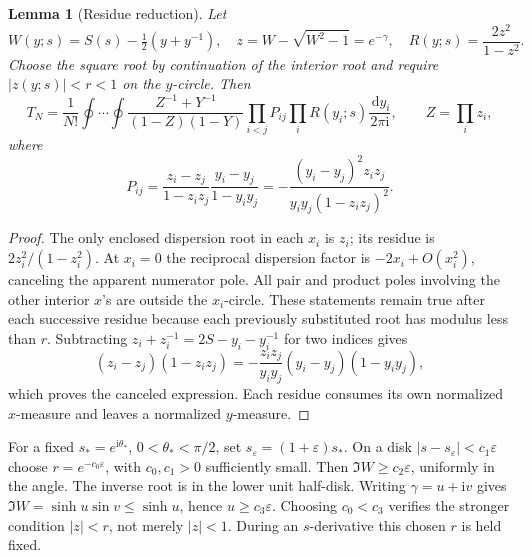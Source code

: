 \documentclass[11pt]{article}
\numberwithin{equation}{section}
\newtheorem{lemma}[theorem]{Lemma}
\theoremstyle{definition}
\newcommand{\dd}{\,\mathrm d}
\newcommand{\ii}{\mathrm i}
\newcommand{\eps}{\varepsilon}
\newcommand{\sstar}{s_*}
\newcommand{\se}{s_\varepsilon}
\begin{document}
\begin{lemma}[Residue reduction]\label{lem:residue}
Let
\[
 W(y;s)=S(s)-\tfrac12(y+y^{-1}),\quad
 z=W-\sqrt{W^2-1}=e^{-\gamma},\quad
 R(y;s)=\frac{2z^2}{1-z^2}.
\]
Choose the square root by continuation of the interior root and require
\(\lvert z(y;s)\rvert<r<1\) on the \(y\)-circle. Then
\begin{equation}
 T_N=\frac1{N!}\oint\cdots\oint
 \frac{Z^{-1}+Y^{-1}}{(1-Z)(1-Y)}
 \prod_{i<j}P_{ij}\prod_i R(y_i;s)\frac{\dd y_i}{2\pi\ii},
 \qquad Z=\prod_i z_i,\label{eq:reduced}
\end{equation}
where
\begin{equation}
 P_{ij}=\frac{z_i-z_j}{1-z_iz_j}\frac{y_i-y_j}{1-y_iy_j}
       =-\frac{(y_i-y_j)^2z_iz_j}{y_iy_j(1-z_iz_j)^2}.
 \label{eq:pair}
\end{equation}
\end{lemma}
\begin{proof}
The only enclosed dispersion root in each \(x_i\) is \(z_i\);
its residue is \(2z_i^2/(1-z_i^2)\). At \(x_i=0\) the reciprocal dispersion
factor is \(-2x_i+O(x_i^2)\), canceling the apparent numerator pole.
All pair and product poles involving the other interior \(x\)'s are
outside the \(x_i\)-circle. These statements remain true after each
successive residue because each previously substituted root has modulus
less than \(r\).
Subtracting \(z_i+z_i^{-1}=2S-y_i-y_i^{-1}\) for two indices gives
\[
 (z_i-z_j)(1-z_iz_j)
 =-\frac{z_iz_j}{y_iy_j}(y_i-y_j)(1-y_iy_j),
\]
which proves the canceled expression. Each residue consumes its own
normalized \(x\)-measure and leaves a normalized \(y\)-measure.
\end{proof}

For a fixed \(\sstar=e^{\ii\theta_*}\), \(0<\theta_*<\pi/2\), set
\(\se=(1+\eps)\sstar\). On a disk \(\lvert s-\se\rvert<c_1\eps\)
choose \(r=e^{-c_0\eps}\), with \(c_0,c_1>0\) sufficiently small.
Then \(\Im W\ge c_2\eps\), uniformly in the angle. The inverse root is
in the lower unit half-disk. Writing \(\gamma=u+\ii v\) gives
\(\Im W=\sinh u\sin v\le\sinh u\), hence \(u\ge c_3\eps\).
Choosing \(c_0<c_3\) verifies the stronger condition \(|z|<r\), not merely
\(|z|<1\). During an \(s\)-derivative this chosen \(r\) is held fixed.
\end{document}
